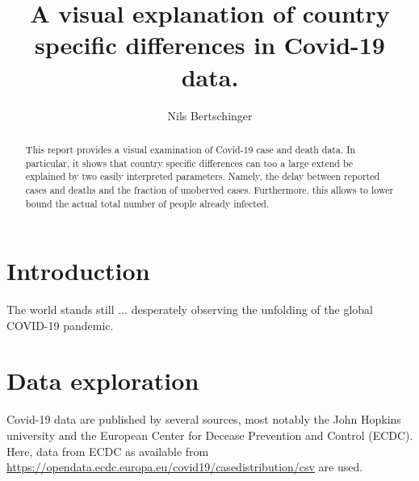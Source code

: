 \documentclass[fullpage,a4paper]{article}
\title{A visual explanation of country specific differences in
  Covid-19 data.}
\author{Nils Bertschinger}
\begin{document}
\maketitle%

\begin{abstract}
  This report provides a visual examination of Covid-19 case and death
  data. In particular, it shows that country specific differences can
  too a large extend be explained by two easily interpreted
  parameters. Namely, the delay between reported cases and deaths and
  the fraction of unoberved cases. Furthermore, this allows to lower
  bound the actual total number of people already infected.
\end{abstract}

\section{Introduction}

The world stands still ... desperately observing the unfolding of the
global COVID-19 pandemic.

\section{Data exploration}

Covid-19 data are published by several sources, most notably the John
Hopkins university and the European Center for Decease Prevention and
Control (ECDC). Here, data from ECDC as available from
\url{https://opendata.ecdc.europa.eu/covid19/casedistribution/csv} are
used.
\end{document}
